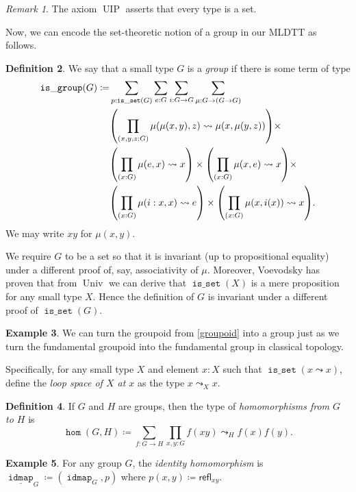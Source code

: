 \documentclass[10pt,letterpaper,cm]{nupset}
\theoremstyle{definition}
\newtheorem{definition}{Definition}[subsection]
\newtheorem{exmp}[definition]{Example}
\theoremstyle{theorem}
\theoremstyle{remark}
\newtheorem{remark}[definition]{Remark}
\newcommand{\refl}{\mathsf{refl}}
\newcommand{\0}{\mathbf{0}}
\newcommand{\1}{\mathbf{1}}
\newcommand{\2}{\mathbf{2}}
\DeclareMathOperator{\idmap}{\mathtt{idmap}}
\DeclareMathOperator{\isset}{\mathtt{is\_set}}
\DeclareMathOperator{\isgrp}{\mathtt{is\_group}}
\DeclareMathOperator{\homm}{\mathtt{hom}}
\DeclareMathOperator{\univ}{\mathrm{Univ}}
\DeclareMathOperator{\uip}{\mathrm{UIP}}
\begin{document}
\begin{remark}
The axiom $\uip$ asserts that every type is a set.
\end{remark}

Now, we can encode the set-theoretic notion  of a group  in our MLDTT as follows. 

\begin{definition}
We say that a small type $G$ is a \textit{group} if there is some term of type 
\begin{align*}
\isgrp(G) \coloneqq & \sum_{p : \isset(G)} \sum_{e : G}\sum_{i: G \to G}\sum_{\mu : G \to (G \to G)}
\\ & \mleft(\prod_{(x, y, z : G)} \mu(\mu(x, y), z) \leadsto \mu(x, \mu(y, z))\mright) \times
\\ & \mleft(\prod_{(x : G)} \mu(e, x) \leadsto x\mright) \times\mleft(\prod_{(x : G)} \mu(x, e) \leadsto x\mright) \times
\\ & \mleft(\prod_{(x : G)} \mu(i : x, x)\leadsto e\mright) \times\mleft(\prod_{(x : G)} \mu(x, i(x))\leadsto x\mright)
.
\end{align*} We may write $xy$ for $\mu(x,y)$. 
\end{definition}

We require $G$ to be a set so that it is invariant (up to propositional equality) under a different proof of, say, associativity of $\mu$. Moreover, Voevodsky has proven that from $\univ$ we can derive that $\isset(X)$ is a mere proposition for any small type $X$. Hence the definition of $G$ is invariant under a different proof of $\isset(G)$.

\begin{exmp}
We can turn the groupoid from \cref{groupoid} into a group just as we turn the fundamental groupoid into the fundamental group in classical topology.  
\smallskip

Specifically, for any small type $X$ and element $x:X$ such that $\isset(x\leadsto x)$, define the \textit{loop space of $X$ at $x$} as the type $ x \leadsto_X x. $
\end{exmp}

\begin{definition}
 If $G$ and $H$ are groups, then the type of \textit{homomorphisms from $G$ to $H$} is $$ \homm(G, H) \coloneqq
 \sum_{f: G\to H}\prod_{x,y:G}f(xy) \leadsto_{H} f(x)f(y)
     .$$ 
\end{definition} 

\begin{exmp}
For any group $G$, the \textit{identity homomorphism} is $\underline{\idmap}_G \coloneqq (\idmap_G, p)$ where $p(x,y) \coloneqq \refl_{xy}$.
\end{exmp}
\end{document}

